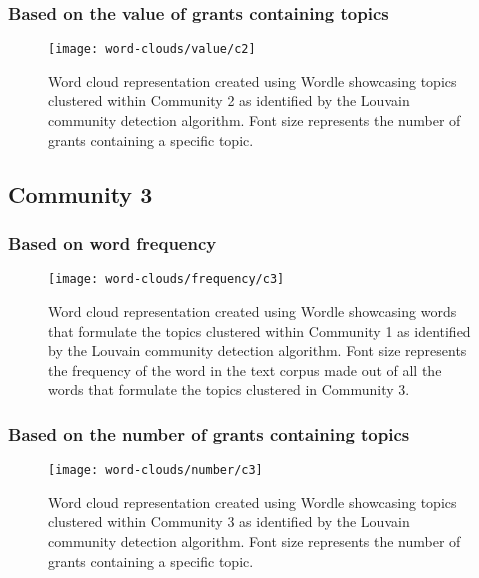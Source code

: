 \clearpage

\subsubsection{Based on the value of grants containing topics}

\begin{figure}[htbp]
    \centering
    \texttt{[image: word-clouds/value/c2]}
    \caption[Word cloud representation based on the value of grants containing topics clustered within Community 2]{Word cloud representation created using Wordle showcasing topics clustered within Community 2 as identified by the Louvain community detection algorithm. Font size represents the number of grants containing a specific topic.}
    \label{fig:topic_grant_value_c2}
\end{figure}

\subsection{Community 3}

\subsubsection{Based on word frequency}

\begin{figure}[htbp]
    \centering
    \texttt{[image: word-clouds/frequency/c3]}
    \caption[Word cloud representation based on word frequency showcasing words that formulate the topics clustered within Community 3]{Word cloud representation created using Wordle showcasing words that formulate the topics clustered within Community 1 as identified by the Louvain community detection algorithm. Font size represents the frequency of the word in the text corpus made out of all the words that formulate the topics clustered in Community 3.}
    \label{fig:topic_grant_freq_c3}
\end{figure}

\clearpage

\subsubsection{Based on the number of grants containing topics}

\begin{figure}[htbp]
    \centering
    \texttt{[image: word-clouds/number/c3]}
    \caption[Word cloud representation based on the number of grants containing topics clustered within Community 3]{Word cloud representation created using Wordle showcasing topics clustered within Community 3 as identified by the Louvain community detection algorithm. Font size represents the number of grants containing a specific topic.}
    \label{fig:topic_grant_number_c3}
\end{figure}

